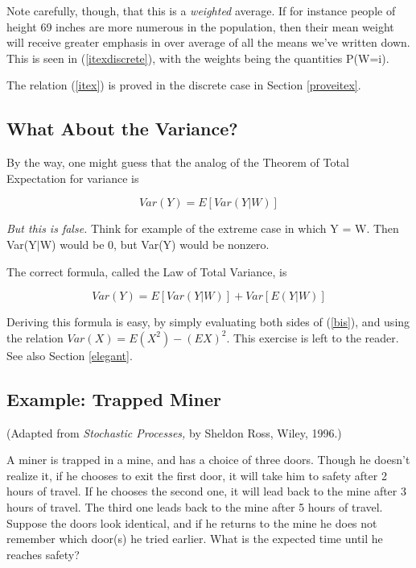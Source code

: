 Note carefully, though, that this is a {\it weighted} average.  If for
instance people of height 69 inches are more numerous in the population,
then their mean weight will receive greater emphasis in over average of
all the means we've written down.  This is seen in (\ref{itexdiscrete}),
with the weights being the quantities P(W=i).

The relation (\ref{itex}) is proved in the discrete case in Section
\ref{proveitex}.

\subsection{What About the Variance?}
\label{totalvar}

By the way, one might guess that the analog of the Theorem of Total Expectation
for variance is

\begin{equation}
Var(Y)=E[Var(Y|W)]
\end{equation}

\textit{But this is false.} Think for example of the extreme case in which Y
= W. Then Var(Y$|$W) would be 0, but Var(Y) would be nonzero.

The correct formula, called the Law of Total Variance, is

\begin{equation}
\label{bis}
Var(Y)=E[Var(Y|W)]+Var[E(Y|W)]
\end{equation}

Deriving this formula is easy, by simply evaluating both sides of
(\ref{bis}), and using the relation $Var(X) = E(X^2) -(EX)^2$. This
exercise is left to the reader.  See also Section \ref{elegant}.

\subsection{Example:  Trapped Miner}
\label{trappedminer}

(Adapted from \textit{Stochastic Processes,} by Sheldon Ross, Wiley, 1996.)

A miner is trapped in a mine, and has a choice of three doors.  Though
he doesn't realize it, if he chooses to exit the first door, it will
take him to safety after 2 hours of travel.  If he chooses the second
one, it will lead back to the mine after 3 hours of travel. The third
one leads back to the mine after 5 hours of travel. Suppose the doors
look identical, and if he returns to the mine he does not remember which
door(s) he tried earlier. What is the expected time until he reaches
safety?

